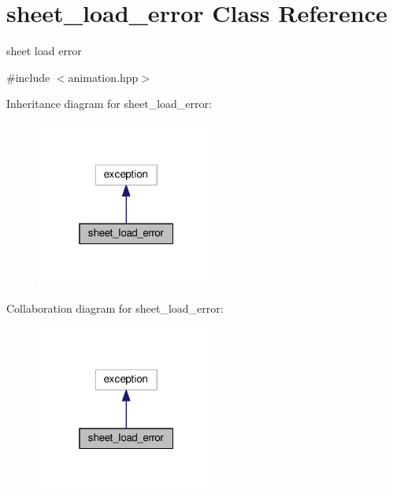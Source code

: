 \hypertarget{classsheet__load__error}{}\section{sheet\+\_\+load\+\_\+error Class Reference}
\label{classsheet__load__error}


sheet load error  




{\ttfamily \#include $<$animation.\+hpp$>$}



Inheritance diagram for sheet\+\_\+load\+\_\+error\+:\nopagebreak
\begin{figure}[H]
\begin{center}
\leavevmode
\includegraphics[width=169pt]{classsheet__load__error__inherit__graph}
\end{center}
\end{figure}


Collaboration diagram for sheet\+\_\+load\+\_\+error\+:\nopagebreak
\begin{figure}[H]
\begin{center}
\leavevmode
\includegraphics[width=169pt]{classsheet__load__error__coll__graph}
\end{center}
\end{figure}
